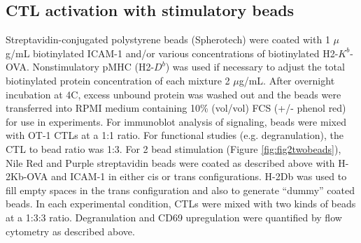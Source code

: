 \subsection{CTL activation with stimulatory beads}
Streptavidin-conjugated polystyrene beads (Spherotech) were coated with 1 $\mu$g/mL biotinylated ICAM-1 and/or various concentrations of biotinylated H2-$K^{b}$-OVA. Nonstimulatory pMHC (H2-$D^{b}$) was used if necessary to adjust the total biotinylated protein concentration of each mixture 2 $\mu$g/mL. After overnight incubation at 4\degree C, excess unbound protein was washed out and the beads were transferred into RPMI medium containing 10\% (vol/vol) FCS (+/- phenol red) for use in experiments. For immunoblot analysis of signaling, beads were mixed with OT-1 CTLs at a 1:1 ratio. For functional studies (e.g. degranulation), the CTL to bead ratio was 1:3. For 2 bead stimulation (Figure \ref{fig:fig2twobeads}), Nile Red and Purple streptavidin beads were coated as described above with H-2Kb-OVA and ICAM-1 in either cis or trans configurations. H-2Db was used to fill empty spaces in the trans configuration and also to generate “dummy” coated beads. In each experimental condition, CTLs were mixed with two kinds of beads at a 1:3:3 ratio. Degranulation and CD69 upregulation were quantified by flow cytometry as described above. 

